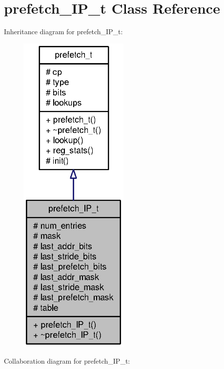 \section{prefetch\_\-IP\_\-t Class Reference}
\label{classprefetch__IP__t}
Inheritance diagram for prefetch\_\-IP\_\-t:\nopagebreak
\begin{figure}[H]
\begin{center}
\leavevmode
\includegraphics[width=154pt]{classprefetch__IP__t__inherit__graph}
\end{center}
\end{figure}
Collaboration diagram for prefetch\_\-IP\_\-t:\nopagebreak
